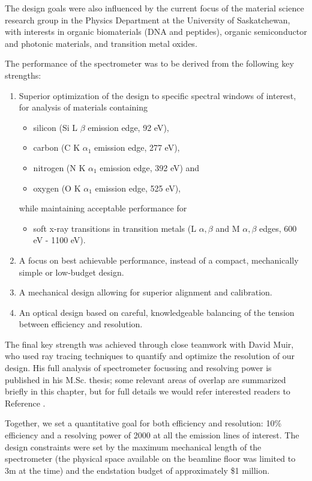 The design goals were also influenced by the current focus of the material science research group in the Physics Department at the University of Saskatchewan, with interests in organic biomaterials (DNA and peptides), organic semiconductor and photonic materials, and transition metal oxides.

The performance of the spectrometer was to be derived from the following key strengths: \cite{Mui06}
\begin{enumerate}
\item Superior optimization of the design to specific spectral windows of interest, for   analysis of materials containing
\begin{itemize}
\item silicon (Si L $\beta$ emission edge, 92 eV), 
\item carbon (C K $\alpha_1$ emission edge, 277 eV), 
\item nitrogen (N K $\alpha_1$ emission edge, 392 eV) and 
\item oxygen (O K $\alpha_1$ emission edge, 525 eV), 
\end{itemize}
while maintaining acceptable performance for 
\begin{itemize}
\item soft x-ray transitions in transition metals (L $\alpha,\beta$ and M $\alpha,\beta$ edges, 600 eV - 1100 eV).
\end{itemize}
\item A focus on best achievable performance, instead of a compact, mechanically simple or low-budget design.
\item A mechanical design allowing for superior alignment and calibration.
\item An optical design based on careful, knowledgeable balancing of the tension between efficiency and resolution.
\end{enumerate}
The final key strength was achieved through close teamwork with David Muir, who used ray tracing techniques to quantify and optimize the resolution of our design.  His full analysis of spectrometer focussing and resolving power is published in his M.Sc. thesis; some relevant areas of overlap are summarized briefly in this chapter, but for full details we would refer interested readers to Reference \cite{Mui06}.

Together, we set a quantitative goal for both efficiency and resolution: 10\% efficiency and a resolving power of 2000 at all the emission lines of interest.  The design constraints were set by the maximum mechanical length of the spectrometer (the physical space available on the beamline floor was limited to 3m at the time) and the endstation budget of approximately \$1 million.
